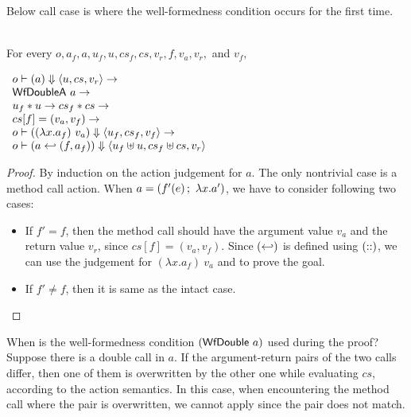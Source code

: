 Below call case is where the well-formedness condition occurs for the
first time.

\begin{lemma}
  \label{lem-inlinedm-action-call}
  \mbox{}\\
  For every $o, a_f, a, u_f, u, cs_f, cs, v_r, f, v_a, v_r,$ and $v_f,$
  \begin{center}
    \begin{math}
      \begin{array}{l}
        \semact{o}{a}{u}{cs}{v_r} \to \\
        \wfdoublea{a} \to \\
        \sdisj{u_f}{u} \to \mdisj{cs_f}{cs} \to \\
        cs[f] = (v_a, v_f) \to \\
        \semact{o}{(\lambda x.a_f)\ v_a}{u_f}{cs_f}{v_f} \to \\
        \semact{o}{\inlinedm{a}{(f, a_f)}}{\splus{u_f}{u}}{\mplus{cs_f}{cs}}{v_r}
      \end{array}
    \end{math}
  \end{center}
\end{lemma}
\begin{proof}
  By induction on the action judgement for $a$. The only nontrivial
  case is a method call action. When $a = (\actcall{x}{f'}{e}{a'})$,
  we have to consider following two cases:
  \begin{itemize}
  \item If $f' = f$, then the method call should have the argument
    value $v_a$ and the return value $v_r$, since $cs[f] = (v_a,
    v_f)$. Since $(\inlinedmsymb)$ is defined using $(\concatsymb)$,
    we can use the judgement for $(\lambda x.a_f)\ v_a$ and
     to prove the goal.
  \item If $f' \neq f$, then it is same as the intact case.
  \end{itemize}
\end{proof}

When is the well-formedness condition $(\wfdouble{a})$ used during the
proof? Suppose there is a double call in $a$. If the argument-return
pairs of the two calls differ, then one of them is overwritten by the
other one while evaluating $cs$, according to the action semantics. In
this case, when encountering the method call where the pair is
overwritten, we cannot apply  since the pair
does not match.

